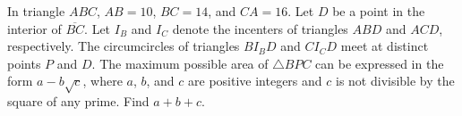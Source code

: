 In triangle $ ABC$, $ AB = 10$, $ BC = 14$, and $ CA = 16$. Let $ D$ be a point in the interior of $ \overline{BC}$. Let $ I_B$ and $ I_C$ denote the incenters of triangles $ ABD$ and $ ACD$, respectively. The circumcircles of triangles $ BI_BD$ and $ CI_CD$ meet at distinct points $ P$ and $ D$. The maximum possible area of $ \triangle BPC$ can be expressed in the form $ a-b\sqrt{c}$, where $ a$, $ b$, and $ c$ are positive integers and $ c$ is not divisible by the square of any prime. Find $ a+b+c$.